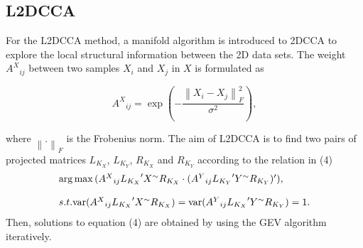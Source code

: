\documentclass[journal]{IEEEtran}
\begin{document}
\subsection{L2DCCA}
For the L2DCCA method, a manifold algorithm is introduced to 2DCCA to explore the local structural information between the 2D data sets. The weight ${A^X}_{ij}$ between two samples $X_i$ and $X_j$ in $X$ is formulated as
\begin{small}
\begin{equation}
{A^X}_{ij} = \exp (-\frac{{{{\left\| {{X_i} - {X_j}} \right\|}^2_{F}}}}{{{\sigma ^2}}}),
\end{equation}
\end{small}
where ${{{{\left\| {.} \right\|}_{F}}}}$ is the Frobenius norm. The aim of L2DCCA is to find two pairs of projected matrices ${L_{K_X}}$, ${L_{K_Y}}$, ${R_{K_X}}$ and ${R_{K_Y}}$ according to the relation in (4)
\begin{equation}
\begin{array}{l}
 \arg \max {\mathop{\rm}} ({A^X}_{ij}{L_{K_X}}^\prime X^{\sim} {R_{K_X}} \cdot ({A^Y}_{ij}{L_{K_Y}}^\prime Y^{\sim}{R_{K_Y}})^\prime), \\
 \\
 s.t.{\mathop{\rm var}} ({A^X}_{ij}{L_{K_X}}^\prime X^{\sim} {R_{K_X}}) = {\mathop{\rm var}} ({A^Y}_{ij}{L_{K_X}}^\prime {Y^{\sim}} {R_{K_Y}}) = 1. \\
 \end{array}
\end{equation}
Then, solutions to equation (4) are obtained by using the GEV algorithm iteratively.
\end{document}
